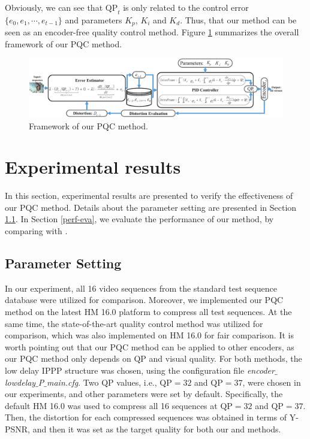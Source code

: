 \documentclass[smallabstract,smallcaptions]{dccpaper}
\begin{document}
Obviously, we can see that $\mathrm{QP}_t$ is only related to the control error $\lbrace e_0,e_1,\cdots,e_{t-1} \rbrace$ and parameters $K_p$, $K_i$ and $K_d$. Thus, that our method can be seen as an encoder-free quality control method. Figure \ref{pqc-overview} summarizes the overall framework of our PQC method.
\vspace{-1em}
\begin{figure}
  \begin{center}
   \includegraphics[width=1.0\linewidth]{Figures/pqcfra_3.eps}
  \end{center}
  \vspace{-1.5em}
\caption{\label{pqc-overview}%
Framework of our PQC method.}
\vspace{-1em}
\end{figure}

\section{Experimental results}
\vspace{-1.0em}
In this section, experimental results are presented to verify the effectiveness of our PQC method. Details about the parameter setting are presented in Section \ref{param-setting}. In Section \ref{perf-eva}, we evaluate the performance of our method, by comparing with \cite{seo2013rate}.
\vspace{-1.0em}
\subsection{Parameter Setting}\label{param-setting}
\vspace{-0.5em}
In our experiment, all 16 video sequences from the standard test sequence database \cite{jctvcg1200} were utilized for comparison. Moreover, we implemented our PQC method on the latest HM 16.0 platform to compress all test sequences. At the same time, the state-of-the-art quality control method \cite{seo2013rate} was utilized for comparison, which was also implemented on HM 16.0 for fair comparison. It is worth pointing out that our PQC method can be applied to other encoders, as our PQC method only depends on $\mathrm{QP}$ and visual quality. For both methods, the low delay IPPP structure was chosen, using the configuration file \emph{encoder$\_$lowdelay$\_$P$\_$main.cfg}. Two $\mathrm{QP}$ values, i.e., $\mathrm{QP}=32$ and $\mathrm{QP}=37$, were chosen in our experiments, and other parameters were set by default. Specifically, the default HM 16.0 was used to compress all 16 sequences at $\mathrm{QP}=32$ and $\mathrm{QP}=37$. Then, the distortion for each compressed sequences was obtained in terms of Y-PSNR, and then it was set as the target quality for both our and \cite{seo2013rate} methods.
\end{document}
